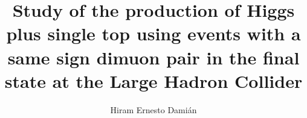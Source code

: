 \title{Study of the production of Higgs plus single top using events with a same sign dimuon pair in the final state at the Large Hadron Collider}


\author{Hiram Ernesto Dami\'an}








     
